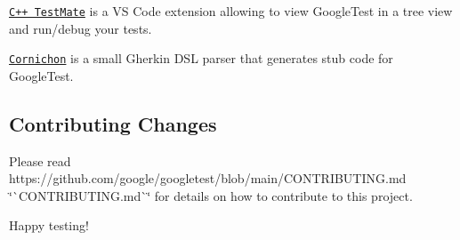 \href{https://github.com/matepek/vscode-catch2-test-adapter}{\tt C++ Test\+Mate} is a VS Code extension allowing to view Google\+Test in a tree view and run/debug your tests.

\href{https://pypi.org/project/cornichon/}{\tt Cornichon} is a small Gherkin D\+SL parser that generates stub code for Google\+Test.

\subsection*{Contributing Changes}

Please read https\+://github.com/google/googletest/blob/main/\+C\+O\+N\+T\+R\+I\+B\+U\+T\+I\+N\+G.\+md \char`\"{}\`{}\+C\+O\+N\+T\+R\+I\+B\+U\+T\+I\+N\+G.\+md\`{}\char`\"{} for details on how to contribute to this project.

Happy testing! 